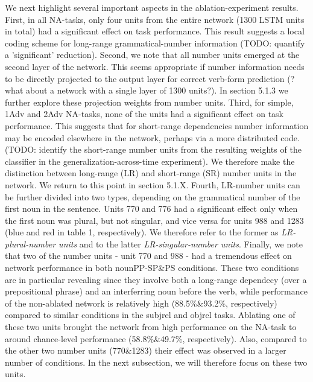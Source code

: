 We next highlight several important aspects in the ablation-experiment results. First, in all NA-tasks, only four units from the entire network (1300 LSTM units in total) had a significant effect on task performance. This result suggests a local coding scheme for long-range grammatical-number information (TODO: quantify a 'significant' reduction). Second, we note that all number units emerged at the second layer of the network. This seems appropriate if number information needs to be directly projected to the output layer for correct verb-form prediction (?what about a network with a single layer of 1300 units?). In section 5.1.3 we further explore these projection weights from number units. Third, for simple, 1Adv and 2Adv NA-tasks, none of the units had a significant effect on task performance. This suggests that for short-range dependencies number information may be encoded elsewhere in the network, perhaps via a more distributed code. (TODO: identify the short-range number units from the resulting weights of the classifier in the generalization-across-time experiment). We therefore make the distinction between long-range (LR) and short-range (SR) number units in the network. We return to this point in section 5.1.X. Fourth, LR-number units can be further divided into two types, depending on the grammatical number of the first noun in the sentence. Units 770 and 776 had a significant effect only when the first noun was plural, but not singular, and vice versa for units 988 and 1283 (blue and red in table 1, respectively). We therefore refer to the former as \textit{LR-plural-number units} and to the latter \textit{LR-singular-number units}. Finally, we note that two of the number units - unit 770 and 988 - had a tremendous effect on network performance in both nounPP-SP\&PS conditions. These two conditions are in particular revealing since they involve both a long-range dependecy (over a prepositional phrase) and an interferring noun before the verb, while performance of the non-ablated network is relatively high (88.5\%\&93.2\%, respectively) compared to similar conditions in the subjrel and objrel tasks. Ablating one of these two units brought the network from high performance on the NA-task to around chance-level performance (58.8\%\&49.7\%, respectively). Also, compared to the other two number units (770\&1283) their effect was observed in a larger number of conditions. In the next subsection, we will therefore focus on these two units.

